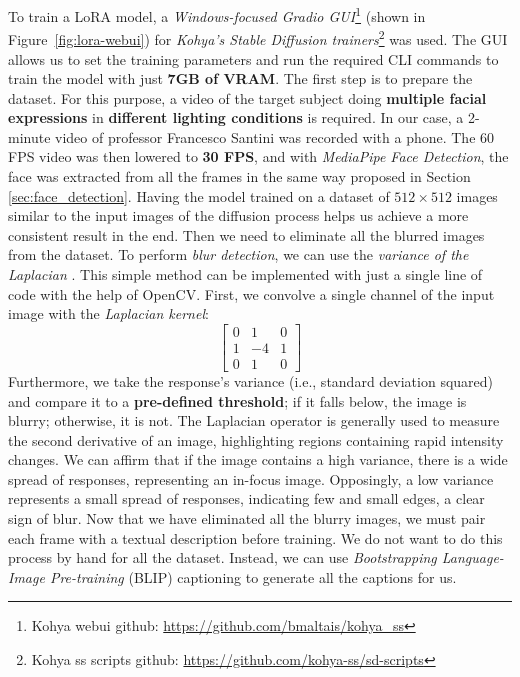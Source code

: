 \documentclass[preprint]{elsarticle}
\begin{document}
To train a LoRA model, a \emph{Windows-focused Gradio GUI}\footnote{Kohya webui github: \url{https://github.com/bmaltais/kohya_ss}}
(shown in Figure~\ref{fig:lora-webui}) 
for \emph{Kohya's Stable Diffusion trainers}\footnote{Kohya ss scripts github: \url{https://github.com/kohya-ss/sd-scripts}} was used. 
The GUI allows us to set the training parameters and run the required 
CLI commands to train the model with just \textbf{7GB of VRAM}. 
The first step is to prepare the dataset. For this purpose, 
a video of the target subject doing \textbf{multiple facial expressions} in \textbf{different lighting conditions} 
is required. In our case, a 2-minute video of professor Francesco Santini was recorded with a phone. 
The 60 FPS video was then lowered to \textbf{30 FPS}, and with \emph{MediaPipe Face Detection},
the face was extracted from all the frames in the same way proposed in Section \ref{sec:face_detection}.
Having the model trained on a dataset of $512\times 512$ images similar to the input images 
of the diffusion process helps us achieve a more consistent result in the end. 
Then we need to eliminate all the blurred images from the dataset. 
To perform \emph{blur detection}, we can use the \emph{variance of the Laplacian} \cite{903548}. 
This simple method can be implemented with just a single line of code with the help of OpenCV. 
First, we convolve a single channel of the input image with the \emph{Laplacian kernel}:
\begin{equation}
	\begin{bmatrix}
		0 & 1 & 0\\
		1 & -4 & 1\\
		0 & 1 & 0
	\end{bmatrix}
\end{equation}
Furthermore, we take the response's variance (i.e., standard deviation squared) 
and compare it to a \textbf{pre-defined threshold}; if it falls below, the image is blurry; otherwise, it is not.
The Laplacian operator is generally used to measure the second derivative of an image, 
highlighting regions containing rapid intensity changes. 
We can affirm that if the image contains a high variance, there is a wide spread of responses, 
representing an in-focus image. Opposingly, a  low variance represents a small spread of responses, 
indicating few and small edges, a clear sign of blur.
Now that we have eliminated all the blurry images, 
we must pair each frame with a textual description before training. 
We do not want to do this process by hand for all the dataset. 
Instead, we can use \emph{Bootstrapping Language-Image Pre-training} (BLIP) captioning \cite{li2022blip} 
to generate all the captions for us. 
\end{document}
